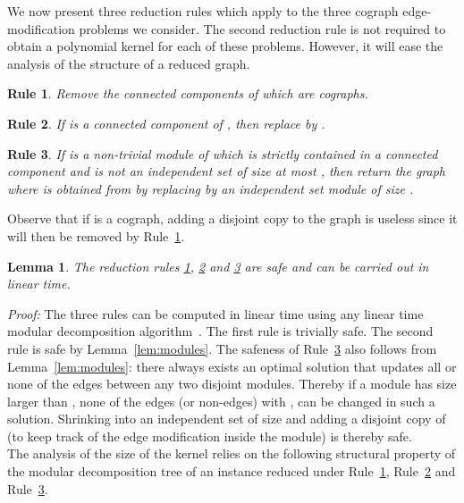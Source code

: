 \documentclass[11pt]{article}
\newenvironment{proof}{\noindent\textit{Proof: }}{{\hfill }}
\newtheorem{lemma}{Lemma}[section]
\newtheorem{reduction}{Rule}
\begin{document}
We now present three reduction rules which apply to the three cograph edge-modification problems we consider. The second reduction rule is not required to obtain a polynomial kernel for each of these problems. However, it will ease the analysis of the structure of a reduced graph.

\begin{reduction} \label{rule1}
Remove the connected components of  which are cographs.
\end{reduction}

\begin{reduction} \label{rule2}
If  is a connected component of , then replace  by .
\end{reduction}

\begin{reduction} \label{rule3}
If  is a non-trivial module of  which is strictly contained in a connected component and is not an independent set of size at most , then return the graph  where  is obtained from  by replacing  by an independent set module of size .
\end{reduction}

Observe that if  is a cograph, adding a disjoint copy to the graph is useless since it will then  be removed by Rule~\ref{rule1}. 

\begin{lemma} \label{lem:rules}
The reduction rules \ref{rule1}, \ref{rule2} and \ref{rule3} are safe and can be carried out in linear time.
\end{lemma}

\begin{proof}
The three rules can be computed in linear time using any linear time modular decomposition algorithm~\cite{HP10}. 
The first rule is trivially safe. The second rule is safe by Lemma~\ref{lem:modules}. The safeness of Rule~\ref{rule3} also follows from Lemma~\ref{lem:modules}: there always exists an optimal solution that updates all or none of the edges between any two disjoint modules. Thereby if a module  has size larger than , none of the edges (or non-edges)  with ,  can be changed in such a solution. Shrinking  into an independent set of size  and adding a disjoint copy of  (to keep track of the edge modification inside the module) is thereby safe.
\end{proof}\\

The analysis of the size of the kernel relies on the following structural property of the modular decomposition tree of an instance reduced under Rule~\ref{rule1}, Rule~\ref{rule2} and Rule~\ref{rule3}.
\end{document}
